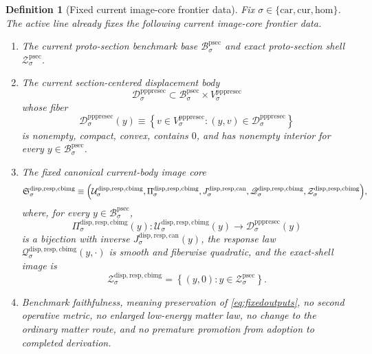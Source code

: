 \documentclass[11pt]{article}
\newcommand{\Car}{\mathrm{car}}
\newcommand{\Cur}{\mathrm{cur}}
\newcommand{\Hom}{\mathrm{hom}}
\newcommand{\ProtoSectionBody}[1]{\mathcal B_{#1}^{\mathrm{psec}}}
\newcommand{\ProtoSectionShell}[1]{\mathcal Z_{#1}^{\mathrm{psec}}}
\newcommand{\PrePreProtoSectionVertical}[1]{V_{#1}^{\mathrm{pppresec}}}
\newcommand{\PrePreProtoSectionResidualBody}[1]{\mathcal D_{#1}^{\mathrm{pppresec}}}
\newcommand{\CurrentBodyImageCore}{\mathfrak S^{\mathrm{disp,resp,cbimg}}}
\newcommand{\ImageProjection}[1]{\Pi_{#1}^{\mathrm{disp,resp,cbimg}}}
\newcommand{\CanonicalLift}[1]{J_{#1}^{\mathrm{disp,resp,can}}}
\newcommand{\CanonicalImageBody}[1]{\mathcal U_{#1}^{\mathrm{disp,resp,cbimg}}}
\newcommand{\CanonicalImageResponseLaw}[1]{\mathscr Q_{#1}^{\mathrm{disp,resp,cbimg}}}
\newcommand{\CanonicalImageShell}[1]{\mathcal Z_{#1}^{\mathrm{disp,resp,cbimg}}}
\newtheorem{definition}{Definition}
\begin{document}
\begin{definition}[Fixed current image-core frontier data]
\label{def:frontier}
Fix \(\sigma\in\{\Car,\Cur,\Hom\}\). The active line already fixes the following current image-core frontier data.
\begin{enumerate}
    \item The current proto-section benchmark base \(\ProtoSectionBody{\sigma}\) and exact proto-section shell \(\ProtoSectionShell{\sigma}\).
    \item The current section-centered displacement body
    \[
    \PrePreProtoSectionResidualBody{\sigma}
    \subset
    \ProtoSectionBody{\sigma}\times\PrePreProtoSectionVertical{\sigma}
    \]
    whose fiber
    \[
    \PrePreProtoSectionResidualBody{\sigma}(y)
    \equiv
    \left\{
    v\in\PrePreProtoSectionVertical{\sigma}:(y,v)\in\PrePreProtoSectionResidualBody{\sigma}
    \right\}
    \]
    is nonempty, compact, convex, contains \(0\), and has nonempty interior for every \(y\in\ProtoSectionBody{\sigma}\).
    \item The fixed canonical current-body image core
    \[
    \CurrentBodyImageCore_{\sigma}
    \equiv
    \Bigl(
    \CanonicalImageBody{\sigma},
    \ImageProjection{\sigma},
    \CanonicalLift{\sigma},
    \CanonicalImageResponseLaw{\sigma},
    \CanonicalImageShell{\sigma}
    \Bigr),
    \]
    where, for every \(y\in\ProtoSectionBody{\sigma}\),
    \[
    \ImageProjection{\sigma}(y):
    \CanonicalImageBody{\sigma}(y)\to\PrePreProtoSectionResidualBody{\sigma}(y)
    \]
    is a bijection with inverse \(\CanonicalLift{\sigma}(y)\), the response law \(\CanonicalImageResponseLaw{\sigma}(y,\cdot)\) is smooth and fiberwise quadratic, and the exact-shell image is
    \[
    \CanonicalImageShell{\sigma}
    =
    \left\{
    (y,0):y\in\ProtoSectionShell{\sigma}
    \right\}.
    \]
    \item Benchmark faithfulness, meaning preservation of \eqref{eq:fixedoutputs}, no second operative metric, no enlarged low-energy matter law, no change to the ordinary matter route, and no premature promotion from adoption to completed derivation.
\end{enumerate}
\end{definition}
\end{document}
